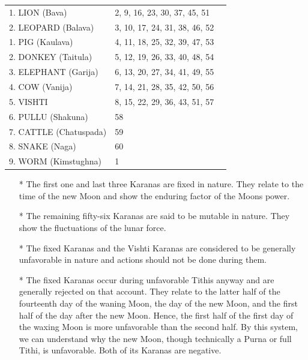 \begin{enumerate}
 
\begin{center}
\begin{tabular}{ l l l}
1.  LION (Bava)&	2,  9, 16, 23, 30, 37, 45, 51             \\
2.  LEOPARD (Balava)	&3, 10, 17, 24, 31, 38, 46, 52            \\
1.    PIG (Kaulava)	&4, 11, 18, 25, 32, 39, 47, 53            \\
2.    DONKEY (Taitula)	&5, 12, 19, 26, 33, 40, 48, 54            \\
3.    ELEPHANT (Garija)	&6, 13, 20, 27, 34, 41, 49, 55            \\
4.    COW (Vanija)	&7, 14, 21, 28, 35, 42, 50, 56            \\
5.    VISHTI	&8, 15, 22, 29, 36, 43, 51, 57            \\
6.    PULLU (Shakuna)	&58            \\
7.    CATTLE (Chatuspada)	&59            \\
8.    SNAKE (Naga)	&60            \\
9.    WORM (Kimstughna)	&1            \\
\end{tabular}
\end{center}

 
\begin{enumerate}

\item[*] The first one and last three Karanas are fixed in nature. They relate to the time of the new Moon and show the enduring factor of the Moons power.

 

\item[*] The remaining fifty-six Karanas are said to be mutable in nature. They show the fluctuations of the lunar force.

 

\item[*] The fixed Karanas and the Vishti Karanas are considered to be generally unfavorable in nature and actions should not be done during them.

 

\item[*] The fixed Karanas occur during unfavorable Tithis anyway and are generally rejected on that account. They relate to the latter half of the fourteenth day of the waning Moon, the day of the new Moon, and the first half of the day after the new Moon. Hence, the first half of the first day of the waxing Moon is more unfavorable than the second half. By this system, we can understand why the new Moon, though technically a Purna or full Tithi, is unfavorable. Both of its Karanas are negative.


\end{enumerate}
\end{enumerate}
